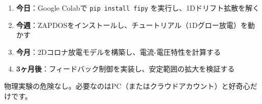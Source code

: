 \documentclass[12pt,a4paper]{ltjsarticle}
\begin{document}
\begin{infobox}[最初の一歩]
\begin{enumerate}[leftmargin=2em]
  \item \textbf{今日}：Google Colabで \texttt{pip install fipy} を実行し、1Dドリフト拡散を解く
  \item \textbf{今週}：ZAPDOSをインストールし、チュートリアル（1Dグロー放電）を動かす
  \item \textbf{今月}：2Dコロナ放電モデルを構築し、電流-電圧特性を計算する
  \item \textbf{3ヶ月後}：フィードバック制御を実装し、安定範囲の拡大を検証する
\end{enumerate}
物理実験の危険なし。必要なのはPC（またはクラウドアカウント）と好奇心だけです。
\end{infobox}
\end{document}
